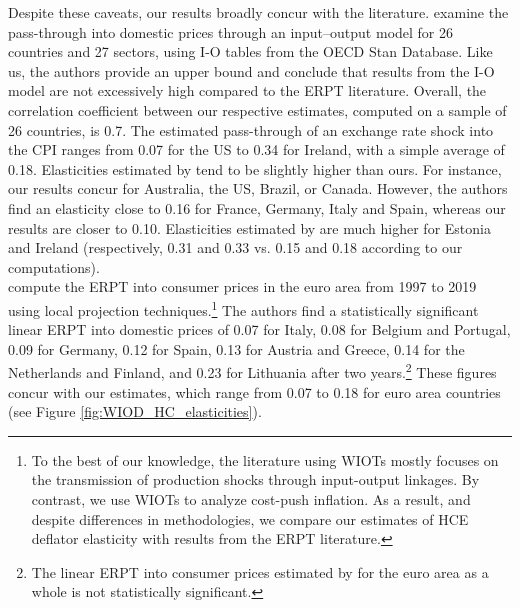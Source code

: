 \documentclass[11pt,a4paper]{paper} %
\begin{document}
Despite these caveats, our results broadly concur with the literature.
\cite{Aydogus2018} examine the pass-through into domestic prices through an input–output model for 26 countries and 27 sectors, using I-O tables from the OECD Stan Database. 
Like us, the authors provide an upper bound and conclude that results from the I-O model are not excessively high compared to the ERPT literature.
Overall, the correlation coefficient between our respective estimates, computed on a sample of 26 countries, is 0.7.
The estimated pass-through of an exchange rate shock into the CPI ranges from 0.07 for the US to 0.34 for Ireland, with a simple average of 0.18.
Elasticities estimated by \cite{Aydogus2018} tend to be slightly higher than ours. 
For instance, our results concur for Australia, the US, Brazil, or Canada. 
However, the authors find an elasticity close to 0.16 for France, Germany, Italy and Spain, whereas our results are closer to 0.10.
Elasticities estimated by \cite{Aydogus2018} are much higher for Estonia and Ireland (respectively, 0.31 and 0.33 vs. 0.15 and 0.18 according to our computations).\\ 
\cite{Colavecchio2020} compute the ERPT into consumer prices in the euro area from 1997 to 2019 using local projection techniques.\footnote{To the best of our knowledge, the literature using WIOTs mostly focuses on the transmission of production shocks through input-output linkages. By contrast, we use WIOTs to analyze cost-push inflation. As a result, and despite differences in methodologies, we compare our estimates of HCE deflator elasticity with results from the ERPT literature.} 
The authors find a statistically significant linear ERPT into domestic prices of 0.07 for Italy, 0.08 for Belgium and Portugal, 0.09 for Germany, 0.12 for Spain, 0.13 for Austria and Greece, 0.14 for the Netherlands and Finland, and 0.23 for Lithuania after two years.\footnote{The linear ERPT into consumer prices estimated by \cite{Colavecchio2020} for the euro area as a whole is not statistically significant.}
These figures concur with our estimates, which range from 0.07 to 0.18 for euro area countries (see Figure \ref{fig:WIOD_HC_elasticities}). 

\end{document}

